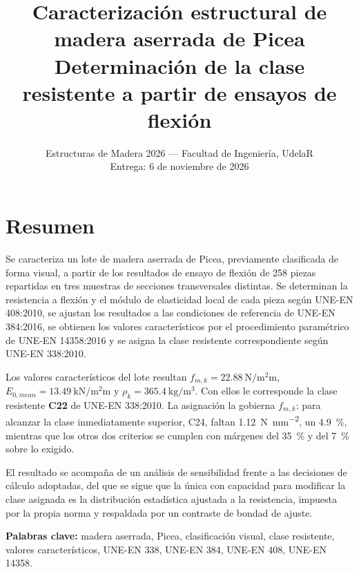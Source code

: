 \documentclass[11pt,a4paper]{article}
\title{\textbf{Caracterización estructural de madera aserrada de Picea}\\[0.3em]
       \large Determinación de la clase resistente a partir de ensayos de flexión}
\author{\pendiente{integrantes del grupo}}
\date{Estructuras de Madera 2026 --- Facultad de Ingeniería, UdelaR \\[0.3em]
      Entrega: 6 de noviembre de 2026}
\begin{document}
\maketitle

\section*{Resumen}
Se caracteriza un lote de madera aserrada de Picea, previamente clasificada de forma
visual, a partir de los resultados de ensayo de flexión de \num{258} piezas repartidas
en tres muestras de secciones transversales distintas. Se determinan la resistencia a
flexión y el módulo de elasticidad local de cada pieza según UNE-EN 408:2010, se
ajustan los resultados a las condiciones de referencia de UNE-EN 384:2016, se obtienen
los valores característicos por el procedimiento paramétrico de UNE-EN 14358:2016 y se
asigna la clase resistente correspondiente según UNE-EN 338:2010.

\medskip
\noindent Los valores característicos del lote resultan $f_{m,k} = \SI{22,88}{\newton\per\square\milli\meter}$, $E_{0,mean} = \SI{13,49}{\kilo\newton\per\square\milli\meter}$ y $\rho_{k} = \SI{365,4}{\kilo\gram\per\cubic\meter}$. Con ellos le corresponde la clase resistente \textbf{C22} de UNE-EN 338:2010. La asignación la gobierna $f_{m,k}$: para alcanzar la clase inmediatamente superior, C24, faltan \SI{1,12}{\newton\per\square\milli\meter}, un \SI{4,9}{\percent}, mientras que los otros dos criterios se cumplen con márgenes del \SI{35}{\percent} y del \SI{7}{\percent} sobre lo exigido.

\medskip
\noindent El resultado se acompaña de un análisis de sensibilidad frente a las
decisiones de cálculo adoptadas, del que se sigue que la única con capacidad para
modificar la clase asignada es la distribución estadística ajustada a la resistencia,
impuesta por la propia norma y respaldada por un contraste de bondad de ajuste.

\vfill
\noindent\textbf{Palabras clave:} madera aserrada, Picea, clasificación visual, clase
resistente, valores característicos, UNE-EN 338, UNE-EN 384, UNE-EN 408, UNE-EN 14358.

\newpage
\tableofcontents
\listoftables
\newpage

\end{document}
